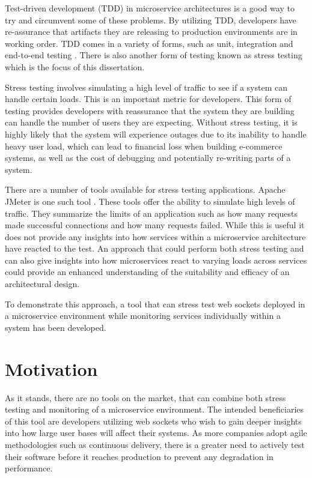Test-driven development (TDD) in microservice architectures is a good way to try and circumvent some of these problems. By utilizing TDD, developers have re-assurance that artifacts they are releasing to production environments are in working order. TDD comes in a variety of forms, such as unit, integration and end-to-end testing \cite{7160271}. There is also another form of testing known as stress testing which is the focus of this dissertation. 

Stress testing involves simulating a high level of traffic to see if a system can handle certain loads. This is an important metric for developers. This form of testing provides developers with reassurance that the system they are building can handle the number of users they are expecting. Without stress testing, it is highly likely that the system will experience outages due to its inability to handle heavy user load, which can lead to financial loss when building e-commerce systems, as well as the cost of debugging and potentially re-writing parts of a system.

There are a number of tools available for stress testing applications. Apache JMeter is one such tool \cite{jmeter}. These tools offer the ability to simulate high levels of traffic. They summarize the limits of an application such as how many requests made successful connections and how many requests failed. While this is useful it does not provide any insights into how services within a microservice architecture have reacted to the test. An approach that could perform both stress testing and can also give insights into how microservices react to varying loads across services could provide an enhanced understanding of the suitability and efficacy of an architectural design. 

To demonstrate this approach, a tool that can stress test web sockets deployed in a microservice environment while monitoring services individually within a system has been developed.

\section{Motivation}

As it stands, there are no tools on the market, that can combine both stress testing and monitoring of a microservice environment. The intended beneficiaries of this tool are developers utilizing web sockets who wish to gain deeper insights into how large user bases will affect their systems. As more companies adopt agile methodologies such as continuous delivery, there is a greater need to actively test their software before it reaches production to prevent any degradation in performance.

